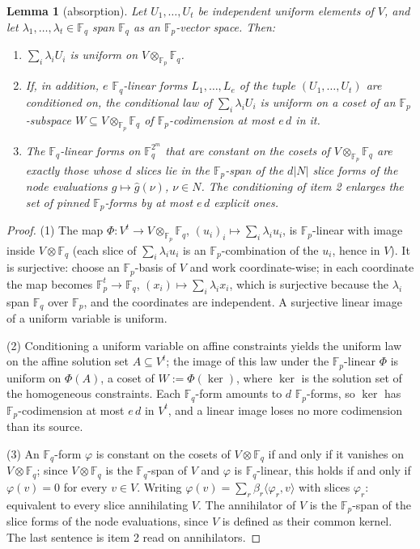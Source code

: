 \documentclass{article}
\newcommand{\Fp}{\mathbb{F}_p}
\newcommand{\Fq}{\mathbb{F}_q}
\newcommand{\extdeg}{d}
\newtheorem{lemma}{Lemma}
\theoremstyle{definition}
\begin{document}
\begin{lemma}[absorption]\label{lem:absorb}
Let $U_1, \dots, U_t$ be independent uniform elements of $V$, and let $\lambda_1, \dots, \lambda_t \in \Fq$ span $\Fq$ as an $\Fp$-vector space. Then:
\begin{enumerate}
    \item $\sum_i \lambda_i U_i$ is uniform on $V \otimes_{\Fp} \Fq$.
    \item If, in addition, $e$ $\Fq$-linear forms $L_1, \dots, L_e$ of the tuple $(U_1, \dots, U_t)$ are conditioned on, the conditional law of $\sum_i \lambda_i U_i$ is uniform on a coset of an $\Fp$-subspace $W \subseteq V \otimes_{\Fp} \Fq$ of $\Fp$-codimension at most $e\,\extdeg$ in it.
    \item The $\Fq$-linear forms on $\Fq^{2^m}$ that are constant on the cosets of $V \otimes_{\Fp} \Fq$ are exactly those whose $\extdeg$ slices lie in the $\Fp$-span of the $\extdeg |N|$ slice forms of the node evaluations $g \mapsto \hat{g}(\nu)$, $\nu \in N$. The conditioning of item 2 enlarges the set of pinned $\Fp$-forms by at most $e\, \extdeg$ explicit ones.
\end{enumerate}
\end{lemma}

\begin{proof}
(1) The map $\Phi : V^t \to V \otimes_{\Fp} \Fq$, $(u_i)_i \mapsto \sum_i \lambda_i u_i$, is $\Fp$-linear with image inside $V \otimes \Fq$ (each slice of $\sum_i \lambda_i u_i$ is an $\Fp$-combination of the $u_i$, hence in $V$). It is surjective: choose an $\Fp$-basis of $V$ and work coordinate-wise; in each coordinate the map becomes $\Fp^t \to \Fq$, $(x_i) \mapsto \sum_i \lambda_i x_i$, which is surjective because the $\lambda_i$ span $\Fq$ over $\Fp$, and the coordinates are independent. A surjective linear image of a uniform variable is uniform.

(2) Conditioning a uniform variable on affine constraints yields the uniform law on the affine solution set $A \subseteq V^t$; the image of this law under the $\Fp$-linear $\Phi$ is uniform on $\Phi(A)$, a coset of $W := \Phi(\ker)$, where $\ker$ is the solution set of the homogeneous constraints. Each $\Fq$-form amounts to $\extdeg$ $\Fp$-forms, so $\ker$ has $\Fp$-codimension at most $e\, \extdeg$ in $V^t$, and a linear image loses no more codimension than its source.

(3) An $\Fq$-form $\varphi$ is constant on the cosets of $V \otimes \Fq$ if and only if it vanishes on $V \otimes \Fq$; since $V \otimes \Fq$ is the $\Fq$-span of $V$ and $\varphi$ is $\Fq$-linear, this holds if and only if $\varphi(v) = 0$ for every $v \in V$. Writing $\varphi(v) = \sum_r \beta_r \langle \varphi_r, v \rangle$ with slices $\varphi_r$: equivalent to every slice annihilating $V$. The annihilator of $V$ is the $\Fp$-span of the slice forms of the node evaluations, since $V$ is defined as their common kernel. The last sentence is item 2 read on annihilators.
\end{proof}
\end{document}

